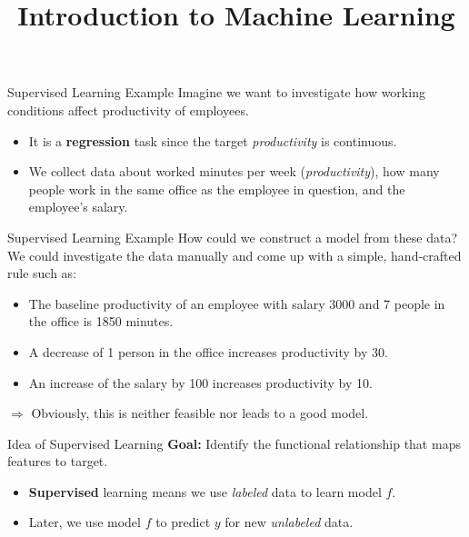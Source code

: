 \documentclass[11pt,compress,t,notes=noshow, xcolor=table]{beamer}
\title{Introduction to Machine Learning}
\begin{document}


\begin{frame2}{Supervised Learning Example}
Imagine we want to investigate how working conditions affect productivity of employees.
\begin{itemize}
  \item It is a \textbf{regression} task since the target \emph{productivity} is continuous.
  \item We collect data about worked minutes per week (\emph{productivity}), how many people work in the same office as the employee in question, and the employee's salary.
\end{itemize}
\end{frame2}


\begin{frame2}{Supervised Learning Example}
How could we construct a model from these data?\\[1ex]
We could investigate the data manually and come up with a simple, hand-crafted rule such as:
\vfill
\begin{itemize}
\item The baseline productivity of an employee with salary 3000 and 7 people in the office is 1850 minutes.
\item A decrease of 1 person in the office increases productivity by 30.
\item An increase of the salary by 100 increases productivity by 10.
\end{itemize}
\vfill
$\Rightarrow$ Obviously, this is neither feasible nor leads to a good model.
\end{frame2}


\begin{frame2}{Idea of Supervised Learning}
\textbf{Goal:} Identify the functional relationship that maps features to target.
\spacer
\begin{itemize}
  \item \textbf{Supervised} learning means we use \emph{labeled} data to learn model $f$.
  \item Later, we use model $f$ to predict $y$ for 
  new \emph{unlabeled} data.
\end{itemize}
\end{frame2}
\end{document}
